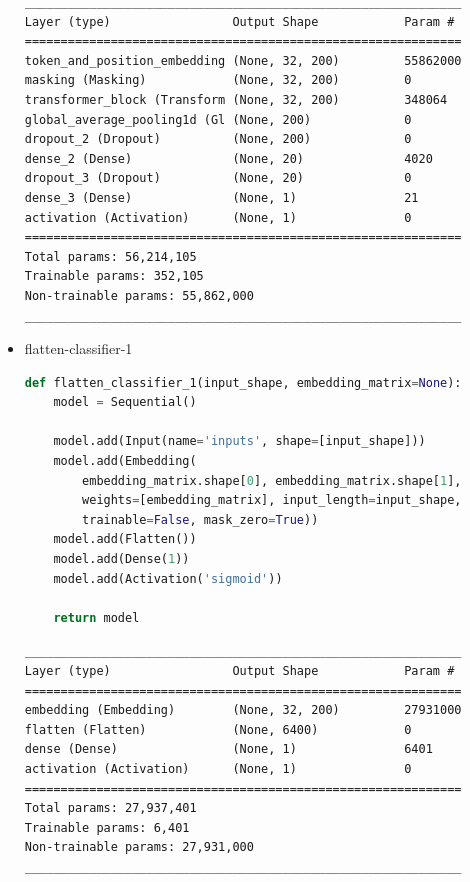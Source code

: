 \documentclass{article}
\begin{document}
\begin{itemize}
\begin{lstlisting}[numbers=none, caption=Обобщение на transformer-classifier-5.]
_____________________________________________________________
Layer (type)                 Output Shape            Param #
=============================================================
token_and_position_embedding (None, 32, 200)         55862000
masking (Masking)            (None, 32, 200)         0
transformer_block (Transform (None, 32, 200)         348064
global_average_pooling1d (Gl (None, 200)             0
dropout_2 (Dropout)          (None, 200)             0
dense_2 (Dense)              (None, 20)              4020
dropout_3 (Dropout)          (None, 20)              0
dense_3 (Dense)              (None, 1)               21
activation (Activation)      (None, 1)               0
=============================================================
Total params: 56,214,105
Trainable params: 352,105
Non-trainable params: 55,862,000
_____________________________________________________________
\end{lstlisting}

  \item flatten-classifier-1

\begin{lstlisting}[language=Python, caption=Дефиниция на flatten-classifier-1.]
def flatten_classifier_1(input_shape, embedding_matrix=None):
    model = Sequential()

    model.add(Input(name='inputs', shape=[input_shape]))
    model.add(Embedding(
        embedding_matrix.shape[0], embedding_matrix.shape[1],
        weights=[embedding_matrix], input_length=input_shape,
        trainable=False, mask_zero=True))
    model.add(Flatten())
    model.add(Dense(1))
    model.add(Activation('sigmoid'))

    return model
\end{lstlisting}

\begin{lstlisting}[numbers=none, caption=Обобщение на flatten-classifier-1.]
_____________________________________________________________
Layer (type)                 Output Shape            Param #
=============================================================
embedding (Embedding)        (None, 32, 200)         27931000
flatten (Flatten)            (None, 6400)            0
dense (Dense)                (None, 1)               6401
activation (Activation)      (None, 1)               0
=============================================================
Total params: 27,937,401
Trainable params: 6,401
Non-trainable params: 27,931,000
_____________________________________________________________
\end{lstlisting}


\end{itemize}
\end{document}
